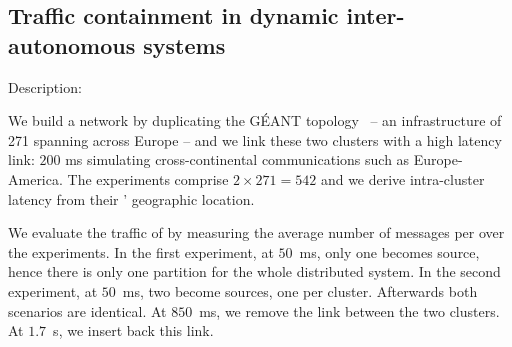 \begin{asparadesc}

\subsection{Traffic containment in dynamic inter-autonomous systems}
  
\item [Description:]

We build a network by duplicating the G{\'E}ANT
topology~\cite{knight2011internet} -- an infrastructure of 271 \nodes
spanning across Europe -- and we link these two clusters with a high
latency link: $200$ ms simulating cross-continental communications
such as Europe-America. The experiments comprise $2 \times 271 = 542$
\processes and we derive intra-cluster latency from their \processes'
geographic location.

\noindent We evaluate the traffic of \NAME by measuring the average
number of messages per \process over the experiments. In the first
experiment, at $50$~ms, only one \process becomes source, hence there
is only one partition for the whole distributed system. In the second
experiment, at $50$~ms, two \processes become sources, one per
cluster. Afterwards both scenarios are identical. At $850$~ms, we
remove the link between the two clusters. At $1.7$~s, we insert back
this link.



\end{asparadesc}
